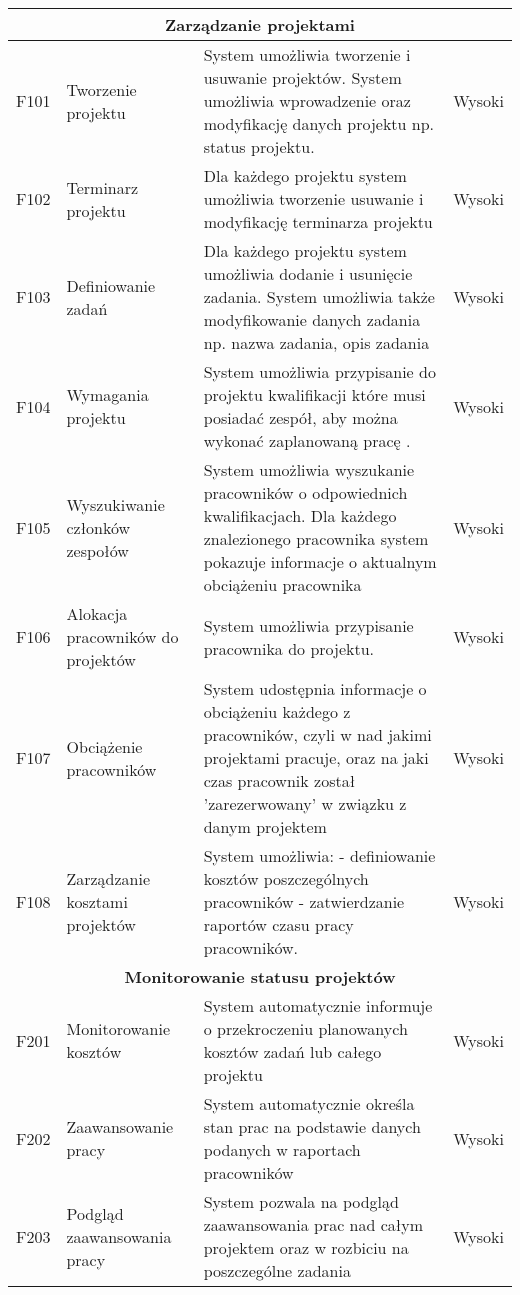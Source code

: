 \begin{tabularx}{\textwidth}{|c|X|X|c|}
\multicolumn{4}{|c|}{\textbf{Zarządzanie projektami}} \\
\hline 
F101 &  Tworzenie projektu & System umożliwia tworzenie i usuwanie projektów. System umożliwia wprowadzenie oraz modyfikację danych projektu np. status projektu. & Wysoki \\ 
\hline
F102 & Terminarz projektu & Dla każdego projektu system umożliwia tworzenie usuwanie i modyfikację terminarza projektu & Wysoki \\
\hline 
F103 & Definiowanie zadań & Dla każdego projektu system umożliwia dodanie i usunięcie zadania. System umożliwia także modyfikowanie danych zadania np. nazwa zadania, opis zadania & Wysoki \\ 
\hline 
F104 & Wymagania projektu & System umożliwia przypisanie do projektu kwalifikacji które musi posiadać zespół, aby można wykonać zaplanowaną pracę . & Wysoki \\ 
\hline 
F105 & Wyszukiwanie członków zespołów & System umożliwia wyszukanie pracowników o odpowiednich kwalifikacjach. Dla każdego znalezionego pracownika system pokazuje informacje o aktualnym obciążeniu pracownika& Wysoki \\ 
\hline 
F106 & Alokacja pracowników do projektów & System umożliwia przypisanie pracownika do projektu. & Wysoki \\ 
\hline 
F107 & Obciążenie pracowników & System udostępnia informacje o obciążeniu każdego z pracowników, czyli w nad jakimi projektami pracuje, oraz na jaki czas pracownik został 'zarezerwowany' w związku z danym projektem & Wysoki \\ 
\hline 
F108 & Zarządzanie kosztami projektów & System umożliwia: \newline
- definiowanie kosztów poszczególnych pracowników \newline
- zatwierdzanie raportów czasu pracy pracowników. & Wysoki \\
\hline
\multicolumn{4}{|c|}{\textbf{Monitorowanie statusu projektów}} \\
\hline 
F201 & Monitorowanie kosztów & System automatycznie informuje o przekroczeniu planowanych kosztów zadań lub całego projektu & Wysoki \\ 
\hline 
F202 & Zaawansowanie pracy & System automatycznie określa stan prac na podstawie danych podanych w raportach pracowników & Wysoki \\
\hline 
F203 & Podgląd zaawansowania pracy & System pozwala na podgląd zaawansowania prac nad całym projektem oraz w rozbiciu na poszczególne zadania & Wysoki \\

\end{tabularx}
